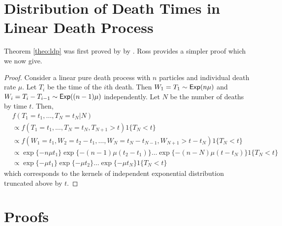 \documentclass[11pt]{article}
\newcommand{\ram}[1]{{\color{green}{ #1}}}
\begin{document}
	\ram{modelling the infection rate over time seems necessary for EBola data.}
	
	\appendix
	
	\section{Distribution of Death Times in Linear Death Process}
	\label{app:ldp}
	
	Theorem \ref{theo:ldp} was first proved by by \cite{Neuts.1971}. Ross provides a simpler proof which we now give.
	
	\begin{proof}
	Consider a linear pure death process with $n$ particles and individual death rate $\mu$.
	Let $T_i$ be the time of the $i$th death. Then $W_1 = T_1 \sim \textsf{Exp}(n\mu)$ and $W_i = T_i - T_{i-1} \sim \textsf{Exp}((n-1)\mu)$ independently. Let $N$ be the number of deaths by time $t$. Then, 
	\begin{align*}
		& f(T_1 = t_1, \dots, T_N = t_N | N) \\
		& \propto f(T_1 = t_1, \dots, T_N = t_N, T_{N+1} > t) 1\{T_N < t\}\\
		& \propto f(W_1 = t_1, W_2 = t_2 - t_1, \dots, W_N = t_N - t_{N-1}, W_{N+1} > t - t_N) 1\{T_N < t\}\\
		& \propto \exp\{-n\mu t_1\} \exp\{-(n-1)\mu(t_2-t_1)\}\dots \exp\{-(n-N)\mu(t - t_N)\} 1\{T_N < t\}\\
		& \propto \exp\{-\mu t_1\}\exp\{-\mu t_2\} \dots \exp\{-\mu t_N\} 1\{T_N < t\}
	\end{align*}
	which corresponds to the kernels of independent exponential distribution truncated above by $t$.
	
	\end{proof}
	
	\section{Proofs}
	\label{app:uni}
	
\end{document}
